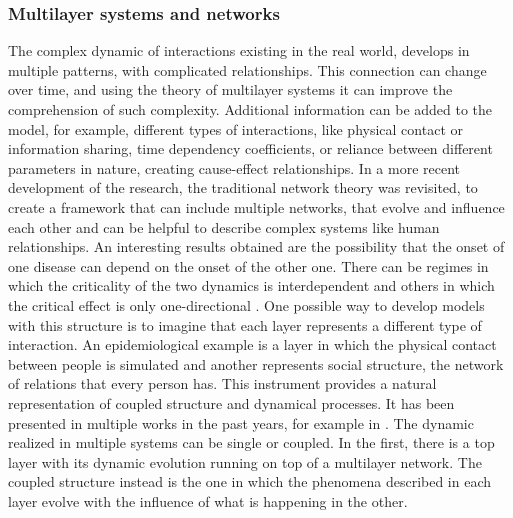\subsubsection{Multilayer systems and networks} 
The complex dynamic of interactions existing in the real world, develops in multiple patterns, with complicated relationships. This connection can change over time, and using the theory of multilayer systems it can improve the comprehension of such complexity. Additional information can be added to the model, for example, different types of interactions, like physical contact or information sharing, time dependency coefficients, or reliance between different parameters in nature, creating cause-effect relationships. 
In a more recent development of the research, the traditional network theory was revisited, to create a framework that can include multiple networks, that evolve and influence each other \cite{DeDomenico2016, Krickel_2023} and can be helpful to describe complex systems like human relationships. An interesting results obtained are the possibility that the onset of one disease can depend on the onset of the other one. There can be regimes in which the criticality of the two dynamics is interdependent and others in which the critical effect is only one-directional \cite{DeDomenico2016}. 
One possible way to develop models with this structure is to imagine that each layer represents a different type of interaction. An epidemiological example is a layer in which the physical contact between people is simulated and another represents social structure, the network of relations that every person has. This instrument provides a natural representation of coupled structure and dynamical processes. It has been presented in multiple works in the past years, for example in \cite{Wang_2019}.
The dynamic realized in multiple systems can be single or coupled. In the first, there is a top layer with its dynamic evolution running on top of a multilayer network. The coupled structure instead is the one in which the phenomena described in each layer evolve with the influence of what is happening in the other. 

